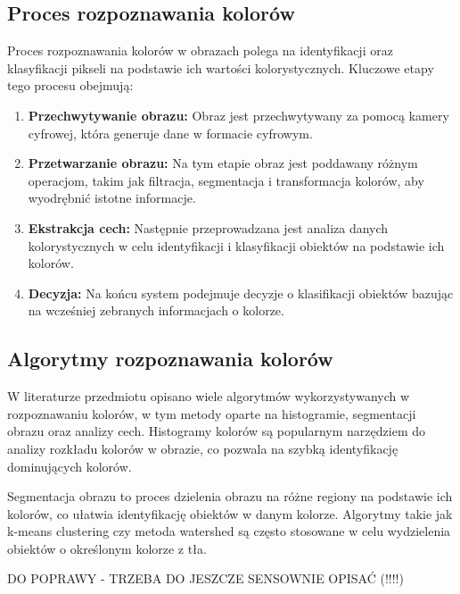 \clearpage

\subsection{Proces rozpoznawania kolorów}

Proces rozpoznawania kolorów w obrazach polega na identyfikacji oraz klasyfikacji pikseli na podstawie ich wartości kolorystycznych. Kluczowe etapy tego procesu obejmują:

\begin{enumerate}
    \item \textbf{Przechwytywanie obrazu:} Obraz jest przechwytywany za pomocą kamery cyfrowej, która generuje dane w formacie cyfrowym. 
    \item \textbf{Przetwarzanie obrazu:} Na tym etapie obraz jest poddawany różnym operacjom, takim jak filtracja, segmentacja i transformacja kolorów, aby wyodrębnić istotne informacje. 
    \item \textbf{Ekstrakcja cech:} Następnie przeprowadzana jest analiza danych kolorystycznych w celu identyfikacji i klasyfikacji obiektów na podstawie ich kolorów. 
    \item \textbf{Decyzja:} Na końcu system podejmuje decyzje o klasifikacji obiektów bazując na wcześniej zebranych informacjach o kolorze.
\end{enumerate}

\subsection{Algorytmy rozpoznawania kolorów}

W literaturze przedmiotu opisano wiele algorytmów wykorzystywanych w rozpoznawaniu kolorów, w tym metody oparte na histogramie, segmentacji obrazu oraz analizy cech. Histogramy kolorów są popularnym narzędziem do analizy rozkładu kolorów w obrazie, co pozwala na szybką identyfikację dominujących kolorów.

Segmentacja obrazu to proces dzielenia obrazu na różne regiony na podstawie ich kolorów, co ułatwia identyfikację obiektów w danym kolorze. Algorytmy takie jak k-means clustering czy metoda watershed są często stosowane w celu wydzielenia obiektów o określonym kolorze z tła.

DO POPRAWY - TRZEBA DO JESZCZE SENSOWNIE OPISAĆ (!!!!)